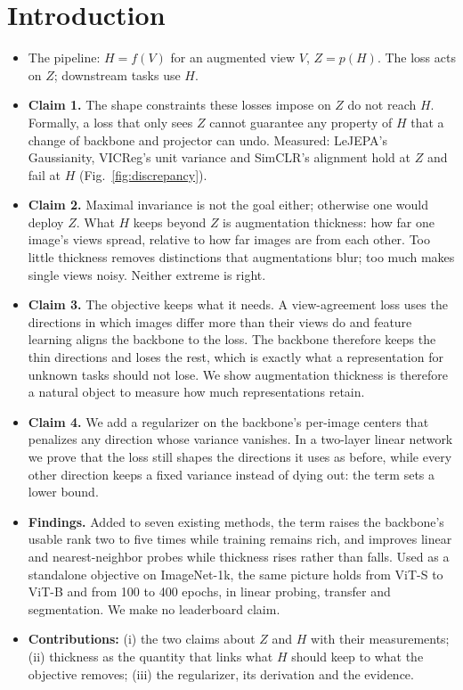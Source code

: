 \documentclass[11pt]{article}
\numberwithin{equation}{section}
\theoremstyle{definition}
\theoremstyle{remark}
\begin{document}
\section{Introduction}
\begin{itemize}
    \item The pipeline: \(H = f(V)\) for an augmented view \(V\), \(Z = p(H)\). The loss
    acts on \(Z\); downstream tasks use \(H\).

    \item \textbf{Claim 1.} The shape constraints these losses impose on \(Z\) do not reach \(H\).
    Formally, a loss that only sees \(Z\) cannot guarantee any property of \(H\) that a
    change of backbone and projector can undo. Measured: LeJEPA's Gaussianity, VICReg's
    unit variance and SimCLR's alignment hold at \(Z\) and fail at \(H\)
    (Fig.~\ref{fig:discrepancy}).

    \item \textbf{Claim 2.} Maximal invariance is not the goal either; otherwise one would deploy
    \(Z\). What \(H\) keeps beyond \(Z\) is augmentation thickness: how far one image's
    views spread, relative to how far images are from each other. Too little thickness
    removes distinctions that augmentations blur; too much makes single views noisy.
    Neither extreme is right.

    \item \textbf{Claim 3.} The objective keeps what it needs. A view-agreement loss uses the directions in which images differ more than their views do and feature learning aligns the backbone to the loss. The backbone therefore keeps the thin directions and loses the rest, which is exactly what a representation for unknown tasks should not lose. We show augmentation thickness is therefore a natural object to measure how much representations retain.

    \item \textbf{Claim 4.} We add a regularizer on the backbone's per-image centers that penalizes any direction whose variance vanishes. In a two-layer linear network we prove that the loss still shapes the directions it uses as before, while every other direction keeps a fixed variance instead of dying out: the term sets a lower bound.

    \item \textbf{Findings.} Added to seven existing methods, the term raises the backbone's usable
    rank two to five times while training remains rich, and improves linear and
    nearest-neighbor probes while thickness rises rather than falls. Used as
    a standalone objective on ImageNet-1k, the same picture holds from ViT-S to ViT-B and
    from 100 to 400 epochs, in linear probing, transfer and segmentation. We make no
    leaderboard claim.

    \item \textbf{Contributions:} (i) the two claims about \(Z\) and \(H\) with their measurements;
    (ii) thickness as the quantity that links what \(H\) should keep to what the objective
    removes; (iii) the regularizer, its derivation and the evidence.
\end{itemize}
\end{document}

